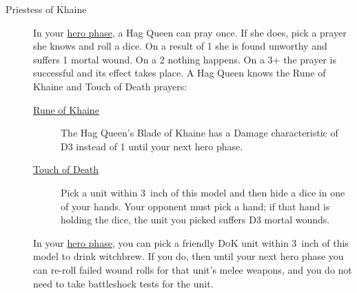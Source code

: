 \begin{description}
    \item [Priestess of Khaine] In your \hyperref[hero-phase]{hero phase},
        a Hag Queen can pray once. If she does, pick a prayer she knows and
        roll a dice. On a result of 1 she is found unworthy and suffers
        1 mortal wound. On a 2 nothing happens. On a 3+ the prayer is
        successful and its effect takes place.  A Hag Queen knows the Rune of
        Khaine and Touch of Death prayers:
        \begin{description}
            \item [{\hyperref[rune-of-khaine]{Rune of Khaine}}] The Hag Queen's
                Blade of Khaine has a Damage characteristic of D3 instead of
                1 until your next hero phase.
            \item [{\hyperref[touch-of-death]{Touch of Death}}] Pick a unit within
                3~inch of this model and then hide a dice in one of your hands.
                Your opponent must pick a hand; if that hand is holding the
                dice, the unit you picked suffers D3 mortal wounds.
        \end{description}
    \item [] In your \hyperref[hero-phase]{hero
        phase}, you can pick a friendly \textsc{DoK} unit within 3~inch of this model to
        drink witchbrew. If you do, then until your next hero phase you can
        re-roll failed wound rolls for that unit's melee weapons, and you do
        not need to take battleshock tests for the unit.
\end{description}


\newpage %

